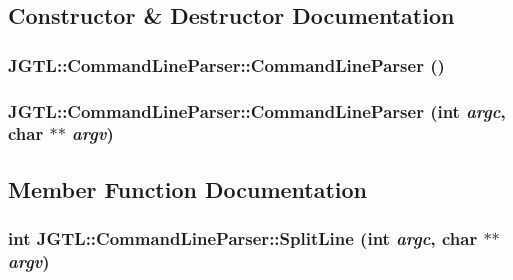 \subsection{Constructor \& Destructor Documentation}
\hypertarget{class_j_g_t_l_1_1_command_line_parser_473d8a614f8409897c4d65794f92a957}{
\subsubsection[CommandLineParser]{\setlength{\rightskip}{0pt plus 5cm}JGTL::Command\-Line\-Parser::Command\-Line\-Parser ()}}
\label{class_j_g_t_l_1_1_command_line_parser_473d8a614f8409897c4d65794f92a957}


\hypertarget{class_j_g_t_l_1_1_command_line_parser_eb3da99a9a6a6dbe1463e4dfb50be1f3}{
\subsubsection[CommandLineParser]{\setlength{\rightskip}{0pt plus 5cm}JGTL::Command\-Line\-Parser::Command\-Line\-Parser (int {\em argc}, char $\ast$$\ast$ {\em argv})}}
\label{class_j_g_t_l_1_1_command_line_parser_eb3da99a9a6a6dbe1463e4dfb50be1f3}




\subsection{Member Function Documentation}
\hypertarget{class_j_g_t_l_1_1_command_line_parser_304f2f63261595edfe8b0f0e231c093c}{
\subsubsection[SplitLine]{\setlength{\rightskip}{0pt plus 5cm}int JGTL::Command\-Line\-Parser::Split\-Line (int {\em argc}, char $\ast$$\ast$ {\em argv})}}
\label{class_j_g_t_l_1_1_command_line_parser_304f2f63261595edfe8b0f0e231c093c}


